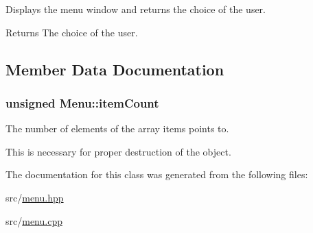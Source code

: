 Displays the menu window and returns the choice of the user. 

\begin{DoxyReturn}{Returns}
The choice of the user. 
\end{DoxyReturn}


\subsection{Member Data Documentation}
\hypertarget{class_menu_a603550e4ba169a208b2ebd0d9946b1bd}{
\subsubsection[{item\-Count}]{\setlength{\rightskip}{0pt plus 5cm}unsigned Menu\-::item\-Count\hspace{0.3cm}{\ttfamily [private]}}}\label{class_menu_a603550e4ba169a208b2ebd0d9946b1bd}


The number of elements of the array items points to. 

This is necessary for proper destruction of the object. 

The documentation for this class was generated from the following files\-:\begin{DoxyCompactItemize}
\item 
src/\hyperlink{menu_8hpp}{menu.\-hpp}\item 
src/\hyperlink{menu_8cpp}{menu.\-cpp}\end{DoxyCompactItemize}
